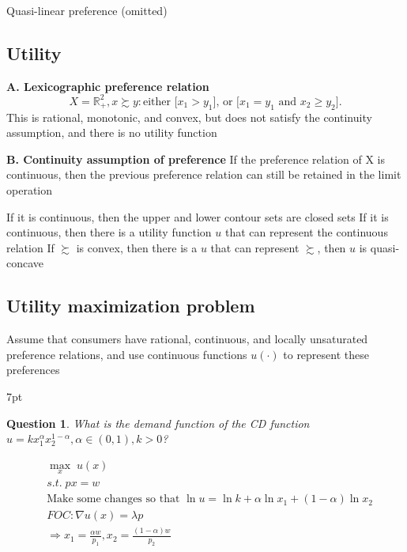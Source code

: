 \documentclass{article}
\newenvironment{redblock}{
\def\FrameCommand{
  \hspace{1pt}
    {\color{LightCoral}
    \vrule width 2pt}
    {\color{redshade}
    \vrule width 4pt}
  \colorbox{redshade}
}
\MakeFramed{
  \advance
  \hsize-
  \width
  \FrameRestore}
\noindent\hspace{-4.55pt}%
\begin{adjustwidth}{}{7pt}
\vspace{2pt}\vspace{2pt}
}
{\vspace{2pt}\end{adjustwidth}\endMakeFramed}
\newtheorem{question}{Question}
\begin{document}
Quasi-linear preference (omitted)

\subsection{Utility}
\textbf{A. Lexicographic preference relation}
$$X=\mathbb{R}^{2}_{+},x\succsim y:\text{either [}x_{1} > y_{1} \text{], or [} x_{1}=y_{1} \text{ and } x_{2} \ge y_{2}\text{]}.$$
This is rational, monotonic, and convex, but does not satisfy the continuity assumption, and there is no utility function

\textbf{B. Continuity assumption of preference}
If the preference relation of X is continuous, then the previous preference relation can still be retained in the limit operation

If it is continuous, then the upper and lower contour sets are closed sets
If it is continuous, then there is a utility function $u$ that can represent the continuous relation
If $\succsim$ is convex, then there is a $u$ that can represent $\succsim$, then $u$ is quasi-concave

\subsection{Utility maximization problem}
Assume that consumers have rational, continuous, and locally unsaturated preference relations, and use continuous functions $u(\cdot)$ to represent these preferences

\begin{redblock}
\begin{question}
What is the demand function of the CD function $u=k x_{1}^{\alpha} x_{2}^{1-\alpha},\alpha \in (0,1),k>0$?
\end{question}
\begin{align}
&\mathop{max}\limits_{x}\; u(x)
\\&s.t. \; px=w
\\&\text{Make some changes so that }\ln u=\ln k +\alpha \ln x_{1} +(1-\alpha)\ln x_{2}
\\&FOC: \nabla u(x)=\lambda p
\\& \Rightarrow x_{1}=\frac{\alpha w}{p_{1}},x_{2}=\frac{(1-\alpha)w}{p_{2}}
\end{align}
\end{redblock}
\end{document}
